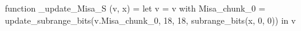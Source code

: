 function _update_Misa_S (v, x) = let v = { v with Misa_chunk_0 = update_subrange_bits(v.Misa_chunk_0, 18, 18, subrange_bits(x, 0, 0)) } in
  v
